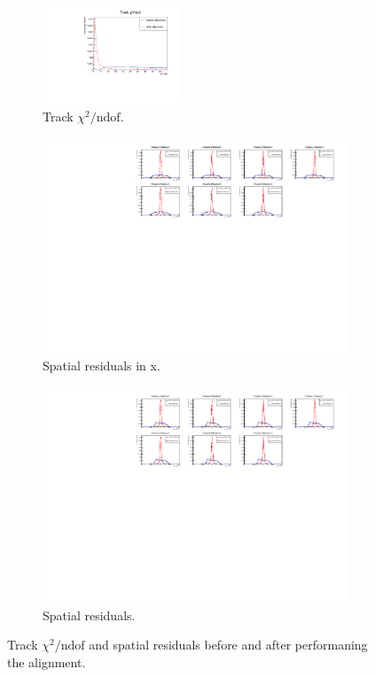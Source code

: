 \documentclass[a4paper,11pt]{article}
\begin{document}
\begin{figure}[!htb]
\begin{subfigure}{\textwidth}
\centering
\includegraphics[width=0.45\textwidth]{07_alignment_trackChi2}
\caption{Track $\chi^2/\text{ndof}$.}
\label{fig:07_alignment_trackChi2}
\end{subfigure}
\begin{subfigure}{\textwidth}
\centering
\includegraphics[width=\textwidth]{07_alignment_residualsX}
\caption{Spatial residuals in x.}
\label{fig:07_alignment_X}
\end{subfigure}
\begin{subfigure}{\textwidth}
\centering
\includegraphics[width=\textwidth]{07_alignment_residualsY}
\caption{Spatial residuals.}
\label{fig:07_alignment_Y}
\end{subfigure}
\caption{Track $\chi^2/\text{ndof}$ and spatial residuals before and after performaning the alignment.}
\label{fig:07_alignment}
\end{figure}
\end{document}
